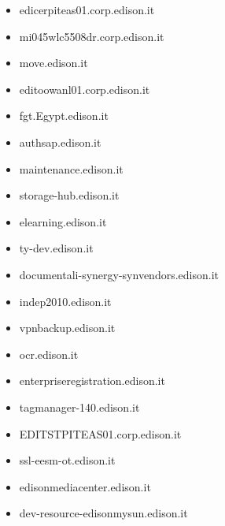 \documentclass{article}
\begin{document}
\begin{itemize}
            \item edicerpiteas01.corp.edison.it
        
            \item mi045wlc5508dr.corp.edison.it
        
            \item move.edison.it
        
            \item editoowanl01.corp.edison.it
        
            \item fgt.Egypt.edison.it
        
            \item authsap.edison.it
        
            \item maintenance.edison.it
        
            \item storage-hub.edison.it
        
            \item elearning.edison.it
        
            \item ty-dev.edison.it
        
            \item documentali-synergy-synvendors.edison.it
        
            \item indep2010.edison.it
        
            \item vpnbackup.edison.it
        
            \item ocr.edison.it
        
            \item enterpriseregistration.edison.it
        
            \item tagmanager-140.edison.it
        
            \item EDITSTPITEAS01.corp.edison.it
        
            \item ssl-eesm-ot.edison.it
        
            \item edisonmediacenter.edison.it
        
            \item dev-resource-edisonmysun.edison.it
        

\end{itemize}
\end{document}
